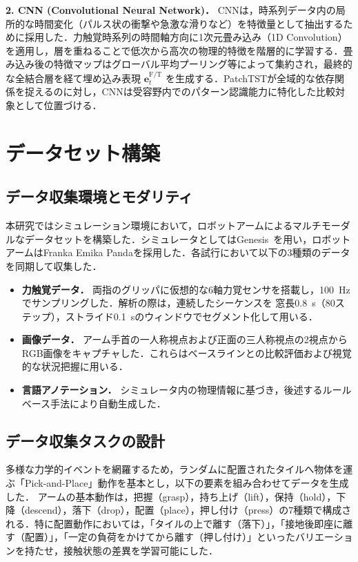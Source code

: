 \documentclass[Japanese]{dicomopapers}
\begin{document}
\textbf{2. CNN (Convolutional Neural Network)．}
CNNは，時系列データ内の局所的な時間変化（パルス状の衝撃や急激な滑りなど）を特徴量として抽出するために採用した．力触覚時系列の時間軸方向に1次元畳み込み（1D Convolution）を適用し，層を重ねることで低次から高次の物理的特徴を階層的に学習する．畳み込み後の特徴マップはグローバル平均プーリング等によって集約され，最終的な全結合層を経て埋め込み表現 $\mathbf{e}^\text{F/T}_t$ を生成する．PatchTSTが全域的な依存関係を捉えるのに対し，CNNは受容野内でのパターン認識能力に特化した比較対象として位置づける．


\section{データセット構築}
\subsection{データ収集環境とモダリティ}
本研究ではシミュレーション環境において，ロボットアームによるマルチモーダルなデータセットを構築した．シミュレータとしてはGenesis~\cite{Genesis}を用い，ロボットアームはFranka Emika Pandaを採用した．各試行において以下の3種類のデータを同期して収集した．

\begin{itemize}
    \item \textbf{力触覚データ．} 両指のグリッパに仮想的な6軸力覚センサを搭載し，\qty{100}{\Hz} でサンプリングした．解析の際は，連続したシーケンスを 窓長\qty{0.8}{s}（80ステップ），ストライド\qty{0.1}{s}のウィンドウでセグメント化して用いる．
    \item \textbf{画像データ．} アーム手首の一人称視点および正面の三人称視点の2視点からRGB画像をキャプチャした．これらはベースラインとの比較評価および視覚的な状況把握に用いる．
    \item \textbf{言語アノテーション．} シミュレータ内の物理情報に基づき，後述するルールベース手法により自動生成した．
\end{itemize}

\subsection{データ収集タスクの設計}
多様な力学的イベントを網羅するため，ランダムに配置されたタイルへ物体を運ぶ「Pick-and-Place」動作を基本とし，以下の要素を組み合わせてデータを生成した．
アームの基本動作は，把握（grasp），持ち上げ（lift），保持（hold），下降（descend），落下（drop），配置（place），押し付け（press）の7種類で構成される．特に配置動作においては，「タイルの上で離す（落下）」，「接地後即座に離す（配置）」，「一定の負荷をかけてから離す（押し付け）」といったバリエーションを持たせ，接触状態の差異を学習可能にした．
\end{document}
